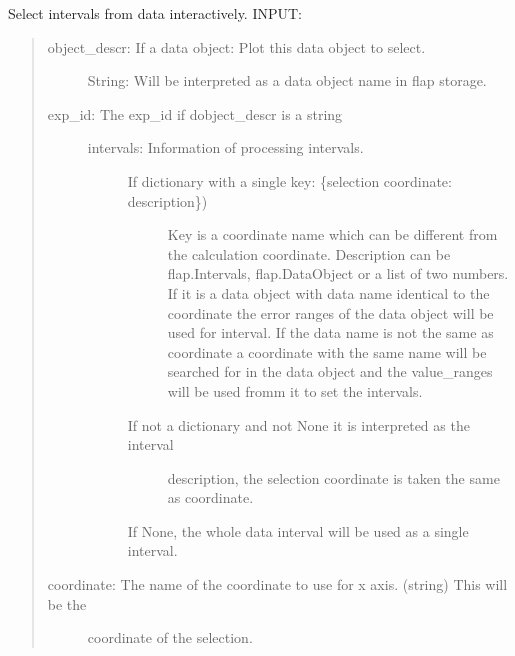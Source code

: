 \documentclass[letterpaper,10pt,english]{sphinxmanual}
\begin{document}
\begin{fulllineitems}
\label{\detokenize{select:flap.select.select_intervals}}
Select intervals from data interactively.
INPUT:
\begin{quote}
\begin{description}
\item[{object\_descr: If a data object: Plot this data object to select.}] \leavevmode
String: Will be interpreted as a data object name in flap storage.

\item[{exp\_id: The exp\_id if dobject\_descr is a string}] \leavevmode\begin{description}
\item[{intervals: Information of processing intervals.}] \leavevmode\begin{description}
\item[{If dictionary with a single key: \{selection coordinate: description\})}] \leavevmode
Key is a coordinate name which can be different from the calculation
coordinate.
Description can be flap.Intervals, flap.DataObject or
a list of two numbers. If it is a data object with data name identical to
the coordinate the error ranges of the data object will be used for
interval. If the data name is not the same as coordinate a coordinate with the
same name will be searched for in the data object and the value\_ranges
will be used fromm it to set the intervals.

\item[{If not a dictionary and not None it is interpreted as the interval}] \leavevmode
description, the selection coordinate is taken the same as
coordinate.

\end{description}

If None, the whole data interval will be used as a single interval.

\end{description}

\item[{coordinate: The name of the coordinate to use for x axis. (string) This will be the}] \leavevmode
coordinate of the selection.

\end{description}


\end{quote}
\end{fulllineitems}
\end{document}
